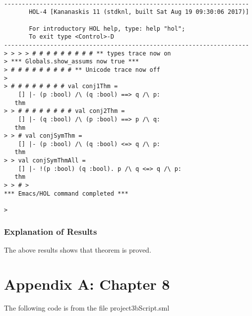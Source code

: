 \documentclass{report}
\begin{document}
\setcounter{sessioncount}{0}
\begin{session}
  \begin{scriptsize}
\begin{verbatim}

---------------------------------------------------------------------
       HOL-4 [Kananaskis 11 (stdknl, built Sat Aug 19 09:30:06 2017)]

       For introductory HOL help, type: help "hol";
       To exit type <Control>-D
---------------------------------------------------------------------
> > > > # # # # # # # # # ** types trace now on
> *** Globals.show_assums now true ***
> # # # # # # # # # ** Unicode trace now off
> 
> # # # # # # # # val conj1Thm =
    [] |- (p :bool) /\ (q :bool) ==> q /\ p:
   thm
> > # # # # # # # # val conj2Thm =
    [] |- (q :bool) /\ (p :bool) ==> p /\ q:
   thm
> > # val conjSymThm =
    [] |- (p :bool) /\ (q :bool) <=> q /\ p:
   thm
> > val conjSymThmAll =
    [] |- !(p :bool) (q :bool). p /\ q <=> q /\ p:
   thm
> > # > 
*** Emacs/HOL command completed ***

> 
\end{verbatim}
  \end{scriptsize}
\end{session}

\subsection{Explanation of Results}
\label{sec:explanation-results-3}
The above results shows that theorem is proved.

\chapter{Appendix A: Chapter 8}
\label{cha:appendix-a:chapter8}

The following code is from the file project3bScript.sml

\end{document}

